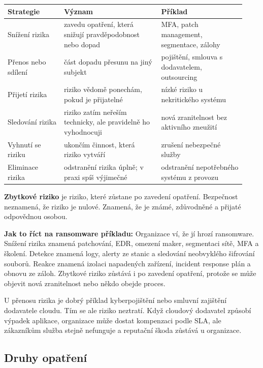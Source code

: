\documentclass[11pt,a4paper]{article}
\newcommand{\itpr}[1]{\medskip\noindent\colorbox{green!8}{\parbox{\dimexpr\linewidth-2\fboxsep}{#1}}\medskip}
\begin{document}
\begin{longtable}{p{0.22\linewidth}p{0.38\linewidth}p{0.33\linewidth}}
\toprule
\textbf{Strategie} & \textbf{Význam} & \textbf{Příklad} \\
\midrule\endhead
Snížení rizika & zavedu opatření, která snižují pravděpodobnost nebo dopad & MFA, patch management, segmentace, zálohy \\
Přenos nebo sdílení & část dopadu přesunu na jiný subjekt & pojištění, smlouva s dodavatelem, outsourcing \\
Přijetí rizika & riziko vědomě ponechám, pokud je přijatelné & nízké riziko u nekritického systému \\
Sledování rizika & riziko zatím neřeším technicky, ale pravidelně ho vyhodnocuji & nová zranitelnost bez aktivního zneužití \\
Vyhnutí se riziku & ukončím činnost, která riziko vytváří & zrušení nebezpečné služby \\
Eliminace rizika & odstranění rizika úplně; v praxi spíš výjimečné & odstranění nepotřebného systému z provozu \\
\bottomrule
\end{longtable}

\textbf{Zbytkové riziko} je riziko, které zůstane po zavedení opatření. Bezpečnost neznamená, že riziko je nulové. Znamená, že je známé, zdůvodněné a přijaté odpovědnou osobou.

\itpr{\textbf{Jak to říct na ransomware příkladu:} Organizace ví, že jí hrozí ransomware. Snížení rizika znamená patchování, EDR, omezení maker, segmentaci sítě, MFA a školení. Detekce znamená logy, alerty ze stanic a sledování neobvyklého šifrování souborů. Reakce znamená izolaci napadených zařízení, incident response plán a obnovu ze záloh. Zbytkové riziko zůstává i po zavedení opatření, protože se může objevit nová zranitelnost nebo někdo obejde proces.}

U přenosu rizika je dobrý příklad kyberpojištění nebo smluvní zajištění dodavatele cloudu. Tím se ale riziko neztratí. Když cloudový dodavatel způsobí výpadek aplikace, organizace může dostat kompenzaci podle SLA, ale zákazníkům služba stejně nefunguje a reputační škoda zůstává u organizace.

\subsection*{Druhy opatření}
\end{document}
